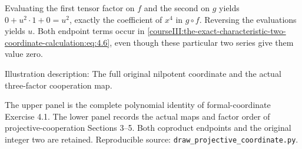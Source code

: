 Evaluating the first tensor factor on \(f\) and the second on \(g\) yields \(0+u^2\cdot1+0=u^2\), exactly the coefficient of \(x^4\) in \(g\circ f\). Reversing the evaluations yields \(u\). Both endpoint terms occur in \eqref{courseIII:the-exact-characteristic-two-coordinate-calculation:eq:4.6}, even though these particular two series give them value zero.

Illustration description: The full original nilpotent coordinate and the actual three-factor cooperation map.

The upper panel is the complete polynomial identity of formal-coordinate Exercise 4.1. The lower panel records the actual maps and factor order of projective-cooperation Sections 3--5. Both coproduct endpoints and the original integer two are retained. Reproducible source: \texttt{draw\_projective\_coordinate.py}.
